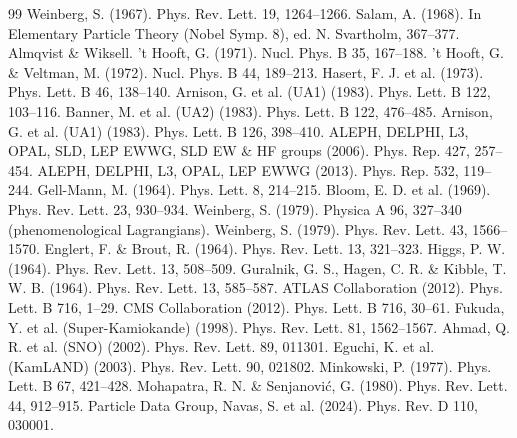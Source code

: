 \begin{thebibliography}{99}
 Weinberg, S. (1967). Phys. Rev. Lett. 19, 1264–1266.
 Salam, A. (1968). In Elementary Particle Theory (Nobel Symp. 8), ed. N. Svartholm, 367–377. Almqvist \& Wiksell.
 't Hooft, G. (1971). Nucl. Phys. B 35, 167–188.
 't Hooft, G. \& Veltman, M. (1972). Nucl. Phys. B 44, 189–213.
 Hasert, F. J. et al. (1973). Phys. Lett. B 46, 138–140.
 Arnison, G. et al. (UA1) (1983). Phys. Lett. B 122, 103–116.
 Banner, M. et al. (UA2) (1983). Phys. Lett. B 122, 476–485.
 Arnison, G. et al. (UA1) (1983). Phys. Lett. B 126, 398–410.
 ALEPH, DELPHI, L3, OPAL, SLD, LEP EWWG, SLD EW \& HF groups (2006). Phys. Rep. 427, 257–454.
 ALEPH, DELPHI, L3, OPAL, LEP EWWG (2013). Phys. Rep. 532, 119–244.
 Gell-Mann, M. (1964). Phys. Lett. 8, 214–215.
 Bloom, E. D. et al. (1969). Phys. Rev. Lett. 23, 930–934.
 Weinberg, S. (1979). Physica A 96, 327–340 (phenomenological Lagrangians).
 Weinberg, S. (1979). Phys. Rev. Lett. 43, 1566–1570.
 Englert, F. \& Brout, R. (1964). Phys. Rev. Lett. 13, 321–323.
 Higgs, P. W. (1964). Phys. Rev. Lett. 13, 508–509.
 Guralnik, G. S., Hagen, C. R. \& Kibble, T. W. B. (1964). Phys. Rev. Lett. 13, 585–587.
 ATLAS Collaboration (2012). Phys. Lett. B 716, 1–29.
 CMS Collaboration (2012). Phys. Lett. B 716, 30–61.
 Fukuda, Y. et al. (Super-Kamiokande) (1998). Phys. Rev. Lett. 81, 1562–1567.
 Ahmad, Q. R. et al. (SNO) (2002). Phys. Rev. Lett. 89, 011301.
 Eguchi, K. et al. (KamLAND) (2003). Phys. Rev. Lett. 90, 021802.
 Minkowski, P. (1977). Phys. Lett. B 67, 421–428.
 Mohapatra, R. N. \& Senjanović, G. (1980). Phys. Rev. Lett. 44, 912–915.
 Particle Data Group, Navas, S. et al. (2024). Phys. Rev. D 110, 030001.
\end{thebibliography}
